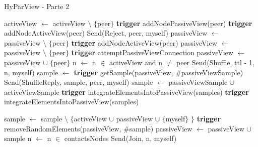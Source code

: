 \begin{algorithm}
\begin{algorithmic}[1]
\end{algorithmic}
\end{algorithm}
\begin{algorithm}
   \caption{HyParView - Parte 2}
    \begin{algorithmic}[1]
            \State activeView $\leftarrow$ activeView $\setminus$ $\{$peer$\}$
            \State \textbf{trigger} addNodePassiveView(peer)
        \EndIf
     \EndFunction
     \State
            \State \textbf{trigger} addNodeActiveView(peer)
        \Else
                \State Send(Reject, peer, myself)
            \Else
                \State passiveView $\leftarrow$ passiveView $\setminus$ $\{$peer$\}$
			    \State \textbf{trigger} addNodeActiveView(peer)
            \EndIf
        \EndIf
     \EndFunction
     \State
        \State passiveView $\leftarrow$ passiveView $\setminus$ $\{$peer$\}$
        \State \textbf{trigger} attemptPassiveViewConnection
        \State passiveView $\leftarrow$ passiveView $\cup$ $\{$peer$\}$
     \EndFunction
     \State
            \State n $\leftarrow$ n $\in$ activeView and n $\ne$ peer
            \State Send(Shuffle, ttl - 1, n, myself)
        \Else
            \State sample $\leftarrow$ \textbf{trigger} getSample(passiveView, \#passiveViewSample)
            \State Send(ShuffleReply, sample, peer, myself)
        \EndIf
        \State sample $\leftarrow$ passiveViewSample $\cup$ activeViewSample
	    \State \textbf{trigger} integrateElementsIntoPassiveView(samples)
     \EndFunction
     \State
        \State \textbf{trigger} integrateElementsIntoPassiveView(samples)
     \EndFunction
     
        \State sample $\leftarrow$ sample $\setminus$ $\{$activeView $\cup$ passiveView $\cup$ $\{$myself$\}$ $\}$
            \State \textbf{trigger} removeRandomElements(passiveView, \#sample)
        \EndIf
        \State passiveView $\leftarrow$ passiveView $\cup$ sample
     \EndFunction
     \State
        \State n $\leftarrow$ n $\in$ contactsNodes
        \State Send(Join, n, myself)
     \EndFunction
     
\end{algorithmic}
\end{algorithm}

